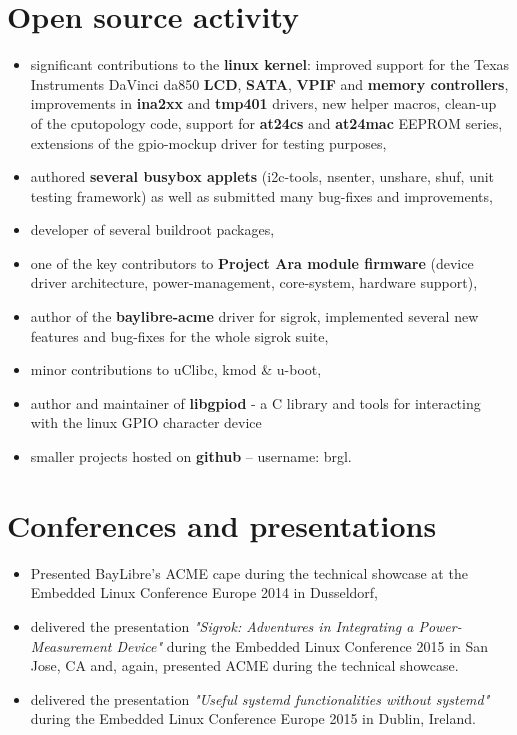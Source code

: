 \documentclass[10pt]{article}
\begin{document}
\section*{Open source activity}
\begin{itemize}
	\item significant contributions to the \textbf{linux kernel}: improved support for the
	Texas Instruments DaVinci da850 \textbf{LCD}, \textbf{SATA}, \textbf{VPIF} and
	\textbf{memory controllers}, improvements in \textbf{ina2xx} and \textbf{tmp401} drivers,
	new helper macros, clean-up of the cputopology code, support for
	\textbf{at24cs} and \textbf{at24mac} EEPROM series, extensions of the gpio-mockup driver
	for testing purposes,
	\item authored \textbf{several busybox applets} (i2c-tools, nsenter, unshare, shuf,
	unit testing framework) as well as submitted many bug-fixes and improvements,
	\item developer of several buildroot packages,
	\item one of the key contributors to \textbf{Project Ara module firmware} (device driver
	architecture, power-management, core-system, hardware support),
	\item author of the \textbf{baylibre-acme} driver for sigrok, implemented several new
	features and bug-fixes for the whole sigrok suite,
	\item minor contributions to uClibc, kmod \& u-boot,
	\item author and maintainer of \textbf{libgpiod} - a C library and tools for interacting
	with the linux GPIO character device
	\item smaller projects hosted on \textbf{github} -- username: brgl.
\end{itemize}

\section*{Conferences and presentations}
\begin{itemize}
	\item Presented BayLibre's ACME cape during the technical showcase at the Embedded Linux
	Conference Europe 2014 in Dusseldorf,
	\item delivered the presentation \textit{"Sigrok: Adventures in Integrating a
	Power-Measurement Device"} during the Embedded Linux Conference 2015 in San Jose, CA and,
	again, presented ACME during the technical showcase.
	\item delivered the presentation \textit{"Useful systemd functionalities without systemd"}
	during the Embedded Linux Conference Europe 2015 in Dublin, Ireland.
\end{itemize}
\end{document}
